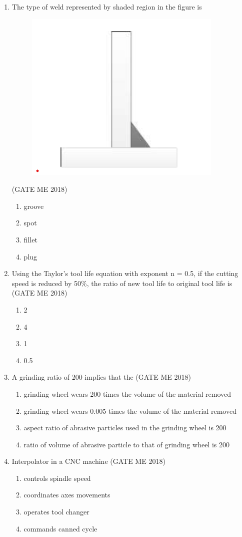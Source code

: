 \documentclass[journal]{IEEEtran}
\numberwithin{equation}{enumi}
\numberwithin{figure}{enumi}
\begin{document}
\begin{enumerate}
\item The type of weld represented by shaded region in the figure is 
\begin{figure}[H]
    \centering
    \includegraphics[width = 0.6\columnwidth]{figs/fig3.3.png}
    \caption*{}
    \label{fig:Q17}
    \end{figure}
    \hfill{(GATE ME 2018)}
\begin{enumerate}
    \item groove
    \item spot
    \item fillet
    \item plug
\end{enumerate}

\item Using the Taylor's tool life equation with exponent n = 0.5, if the cutting speed is reduced by 50\%, the ratio of new tool life to original tool life is
\hfill{(GATE ME 2018)}
\begin{multicols}{4}
    \begin{enumerate}
        \item 2
        \item 4
        \item 1
        \item 0.5
    \end{enumerate}
\end{multicols}
 \item A grinding ratio of 200 implies that the
 \hfill{(GATE ME 2018)}
 \begin{enumerate}
\item grinding wheel wears 200 times the volume of the material removed
\item  grinding wheel wears 0.005 times the volume of the material removed
\item  aspect ratio of abrasive particles used in the grinding wheel is 200
\item  ratio of volume of abrasive particle to that of grinding wheel is 200    
 \end{enumerate}
\item Interpolator in a CNC machine
\hfill{(GATE ME 2018)}
\begin{enumerate}
\item controls spindle speed
\item  coordinates axes movements
\item  operates tool changer
\item  commands canned cycle


\end{enumerate}
\end{enumerate}
\end{document}
